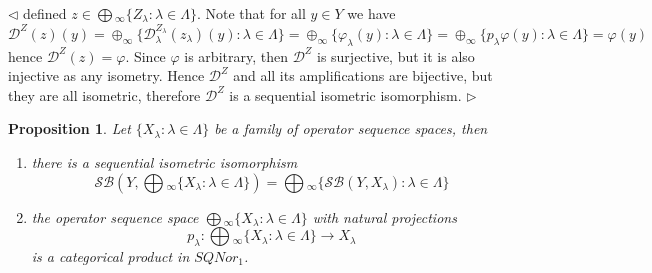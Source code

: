 \documentclass[12pt]{article}
\newtheorem{proposition}[theorem]{Proposition}
\newenvironment{proof}{\par $\triangleleft$}{$\triangleright$}
\begin{document}
\begin{proof}
defined $z\in\bigoplus{}_\infty \{Z_\lambda:\lambda\in\Lambda \}$. Note that for 
all $y\in Y$ we have
$$
\mathcal{D}^{Z}(z)(y)
=\oplus_\infty \{
    \mathcal{D}_\lambda^{Z_\lambda}(z_\lambda)(y):\lambda\in\Lambda
 \}
=\oplus_\infty \{\varphi_\lambda(y):\lambda\in\Lambda \}
=\oplus_\infty \{p_\lambda\varphi(y):\lambda\in\Lambda \} =\varphi(y)
$$
hence $\mathcal{D}^Z(z)=\varphi$. Since $\varphi$ is arbitrary, then 
$\mathcal{D}^Z$ is surjective, but it is also injective as any isometry. 
Hence $\mathcal{D}^Z$ and all its amplifications are bijective, but they are 
all isometric, therefore $\mathcal{D}^Z$ is a sequential isometric isomorphism.
\end{proof}

\begin{proposition}\label{PrSQProdUnivProp} Let 
$ \{X_\lambda:\lambda\in \Lambda \}$ be a family of operator sequence spaces, 
then
\begin{enumerate}[label = (\roman*)]
    \item there is a sequential isometric isomorphism
    $$
    \mathcal{SB}\left(
        Y,\bigoplus{}_\infty \{X_\lambda:\lambda\in\Lambda \}
    \right)
    =\bigoplus{}_\infty \{\mathcal{SB}(Y,X_\lambda):\lambda\in\Lambda \}
    $$

    \item the operator sequence space 
    $\bigoplus{}_\infty \{X_\lambda:\lambda\in\Lambda \}$ 
    with natural projections 
    $$
        p_\lambda
        :\bigoplus{}_\infty \{X_\lambda
        :\lambda\in\Lambda \}\to X_\lambda
    $$
    is a categorical product in $SQNor_1$.
\end{enumerate}
\end{proposition}
\end{document}
